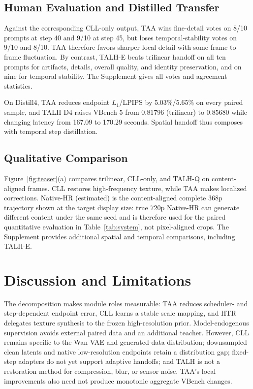 \subsection{Human Evaluation and Distilled Transfer}

Against the corresponding CLL-only output, TAA wins fine-detail votes on 8/10 prompts at step 40 and 9/10 at step 45, but loses temporal-stability votes on 9/10 and 8/10. TAA therefore favors sharper local detail with some frame-to-frame fluctuation. By contrast, TALH-E beats trilinear handoff on all ten prompts for artifacts, details, overall quality, and identity preservation, and on nine for temporal stability. The Supplement gives all votes and agreement statistics.

On Distill4, TAA reduces endpoint \(L_1\)/LPIPS by 5.03\%/5.65\% on every paired sample, and TALH-D4 raises VBench-5 from 0.81796 (trilinear) to 0.85680 while changing latency from 167.09 to 170.29 seconds. Spatial handoff thus composes with temporal step distillation.

\subsection{Qualitative Comparison}

Figure~\ref{fig:teaser}(a) compares trilinear, CLL-only, and TALH-Q on content-aligned frames. CLL restores high-frequency texture, while TAA makes localized corrections. Native-HR (estimated) is the content-aligned complete 368p trajectory shown at the target display size: true 720p Native-HR can generate different content under the same seed and is therefore used for the paired quantitative evaluation in Table~\ref{tab:system}, not pixel-aligned crops. The Supplement provides additional spatial and temporal comparisons, including TALH-E.

\section{Discussion and Limitations}

The decomposition makes module roles measurable: TAA reduces scheduler- and step-dependent endpoint error, CLL learns a stable scale mapping, and HTR delegates texture synthesis to the frozen high-resolution prior. Model-endogenous supervision avoids external paired data and an additional teacher. However, CLL remains specific to the Wan VAE and generated-data distribution; downsampled clean latents and native low-resolution endpoints retain a distribution gap; fixed-step adapters do not yet support adaptive handoffs; and TALH is not a restoration method for compression, blur, or sensor noise. TAA's local improvements also need not produce monotonic aggregate VBench changes.

